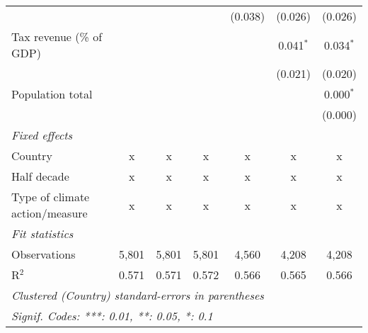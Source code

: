 \begin{tabular}{lcccccc}
                                                         &         &              &                & (0.038)        & (0.026)        & (0.026)\\   
   Tax revenue (\% of GDP)                               &         &              &                &                & 0.041$^{*}$    & 0.034$^{*}$\\   
                                                         &         &              &                &                & (0.021)        & (0.020)\\   
   Population total                                      &         &              &                &                &                & 0.000$^{*}$\\   
                                                         &         &              &                &                &                & (0.000)\\   
   \emph{Fixed effects}\\
   Country                                               & x       & x            & x              & x              & x              & x\\  
   Half decade                                           & x       & x            & x              & x              & x              & x\\  
   Type of climate action/measure                        & x       & x            & x              & x              & x              & x\\  
   \midrule \emph{Fit statistics}\\
   Observations                                          & 5,801   & 5,801        & 5,801          & 4,560          & 4,208          & 4,208\\  
   R$^2$                                                 & 0.571   & 0.571        & 0.572          & 0.566          & 0.565          & 0.566\\  
   \midrule
   \multicolumn{7}{l}{\emph{Clustered (Country) standard-errors in parentheses}}\\
   \multicolumn{7}{l}{\emph{Signif. Codes: ***: 0.01, **: 0.05, *: 0.1}}\\
\end{tabular}
\par\endgroup


